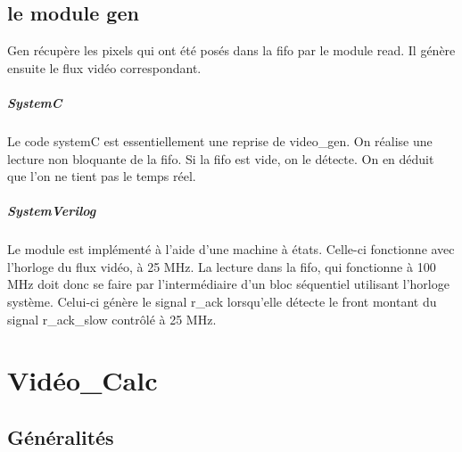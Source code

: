 \documentclass[a4paper,12pt]{report}
\begin{document}
{{                               \section*{le module gen}
                               Gen récupère les pixels qui ont été posés dans la fifo par le module read.
                               Il génère ensuite le flux vidéo correspondant.

                               \paragraph{SystemC}
                               Le code systemC est essentiellement une reprise de video\_gen.
                               On réalise une lecture non bloquante de la fifo.
                               Si la fifo est vide, on le détecte.
                               On en déduit que l'on ne tient pas le temps réel.

                               \paragraph{SystemVerilog}
                               Le module est implémenté à l'aide d'une machine à états.
                               Celle-ci fonctionne avec l'horloge du flux vidéo, à 25 MHz.
                               La lecture dans la fifo, qui fonctionne à 100 MHz doit donc se faire
                               par l'intermédiaire d'un bloc séquentiel utilisant l'horloge système.
                               Celui-ci génère le signal r\_ack lorsqu'elle détecte le front montant
                               du signal r\_ack\_slow contrôlé à 25 MHz.


                               \chapter{Vidéo\_Calc}

                               \section{Généralités}

}}
\end{document}
